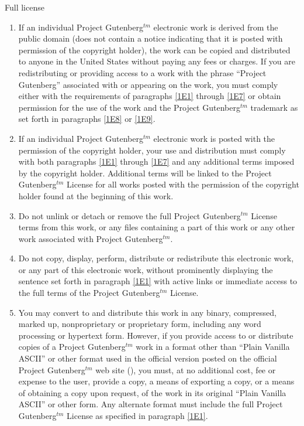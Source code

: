 \begin{chapter}{Full license}
\begin{enumerate}
\begin{enumerate}
\item If an individual Project Gutenberg$^{tm}$ electronic work is derived
from the public domain (does not contain a notice indicating that it is
posted with permission of the copyright holder), the work can be copied
and distributed to anyone in the United States without paying any fees
or charges.  If you are redistributing or providing access to a work
with the phrase ``Project Gutenberg'' associated with or appearing on the
work, you must comply either with the requirements of paragraphs \ref{1E1}
through \ref{1E7} or obtain permission for the use of the work and the
Project Gutenberg$^{tm}$ trademark as set forth in paragraphs \ref{1E8} or
\ref{1E9}.

\item If an individual Project Gutenberg$^{tm}$ electronic work is posted
with the permission of the copyright holder, your use and distribution
must comply with both paragraphs \ref{1E1} through \ref{1E7} and any additional
terms imposed by the copyright holder.  Additional terms will be linked
to the Project Gutenberg$^{tm}$ License for all works posted with the
permission of the copyright holder found at the beginning of this work.

\item Do not unlink or detach or remove the full Project Gutenberg$^{tm}$
License terms from this work, or any files containing a part of this
work or any other work associated with Project Gutenberg$^{tm}$.

\item Do not copy, display, perform, distribute or redistribute this
electronic work, or any part of this electronic work, without
prominently displaying the sentence set forth in paragraph \ref{1E1} with
active links or immediate access to the full terms of the Project
Gutenberg$^{tm}$ License.

\item You may convert to and distribute this work in any binary,
compressed, marked up, nonproprietary or proprietary form, including any
word processing or hypertext form.  However, if you provide access to or
distribute copies of a Project Gutenberg$^{tm}$ work in a format other than
``Plain Vanilla ASCII'' or other format used in the official version
posted on the official Project Gutenberg$^{tm}$ web site
(), you must, at no additional cost,
fee or expense to the user, provide a copy, a means of exporting a copy, or a means of obtaining a copy upon
request, of the work in its original ``Plain Vanilla ASCII'' or other
form.  Any alternate format must include the full Project Gutenberg$^{tm}$
License as specified in paragraph \ref{1E1}.


\end{enumerate}
\end{enumerate}
\end{chapter}
